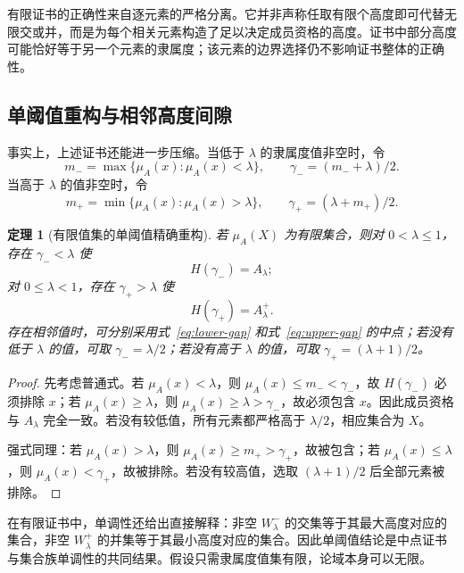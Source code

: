 \documentclass[UTF8,fontset=fandol,zihao=-4,a4paper]{ctexart}
\numberwithin{equation}{section}
\theoremstyle{reportplain}
\newtheorem{theorem}{定理}[section]
\newcommand{\muA}{\mu_A}
\newcommand{\cut}[1]{A_{#1}}
\newcommand{\scut}[1]{A_{#1}^{+}}
\newcommand{\set}[1]{\{#1\}}
\newcommand{\eqtag}[1]{\label{#1}}
\begin{document}
有限证书的正确性来自逐元素的严格分离。它并非声称任取有限个高度即可代替无限交或并，而是为每个相关元素构造了足以决定成员资格的高度。证书中部分高度可能恰好等于另一个元素的隶属度；该元素的边界选择仍不影响证书整体的正确性。

\subsection{单阈值重构与相邻高度间隙}
事实上，上述证书还能进一步压缩。当低于 $\lambda$ 的隶属度值非空时，令
\begin{equation}
m_- =\max\set{\muA(x):\muA(x)<\lambda},
\qquad\gamma_-=(m_-+\lambda)/2.
\eqtag{eq:lower-gap}
\end{equation}
当高于 $\lambda$ 的值非空时，令
\begin{equation}
m_+ =\min\set{\muA(x):\muA(x)>\lambda},
\qquad\gamma_+=(\lambda+m_+)/2.
\eqtag{eq:upper-gap}
\end{equation}

\begin{theorem}[有限值集的单阈值精确重构]
若 $\muA(X)$ 为有限集合，则对 $0<\lambda\le1$，存在 $\gamma_-<\lambda$ 使
\begin{equation}
H(\gamma_-)=\cut{\lambda};
\eqtag{eq:single-left}
\end{equation}
对 $0\le\lambda<1$，存在 $\gamma_+>\lambda$ 使
\begin{equation}
H(\gamma_+)=\scut{\lambda}.
\eqtag{eq:single-right}
\end{equation}
存在相邻值时，可分别采用式~\eqref{eq:lower-gap} 和式~\eqref{eq:upper-gap} 的中点；若没有低于 $\lambda$ 的值，可取 $\gamma_-=\lambda/2$；若没有高于 $\lambda$ 的值，可取 $\gamma_+=(\lambda+1)/2$。
\end{theorem}
\begin{proof}
先考虑普通式。若 $\muA(x)<\lambda$，则 $\muA(x)\le m_-<\gamma_-$，故 $H(\gamma_-)$ 必须排除 $x$；若 $\muA(x)\ge\lambda$，则 $\muA(x)\ge\lambda>\gamma_-$，故必须包含 $x$。因此成员资格与 $\cut{\lambda}$ 完全一致。若没有较低值，所有元素都严格高于 $\lambda/2$，相应集合为 $X$。

强式同理：若 $\muA(x)>\lambda$，则 $\muA(x)\ge m_+>\gamma_+$，故被包含；若 $\muA(x)\le\lambda$，则 $\muA(x)<\gamma_+$，故被排除。若没有较高值，选取 $(\lambda+1)/2$ 后全部元素被排除。\end{proof}

在有限证书中，单调性还给出直接解释：非空 $W^-_\lambda$ 的交集等于其最大高度对应的集合，非空 $W^+_\lambda$ 的并集等于其最小高度对应的集合。因此单阈值结论是中点证书与集合族单调性的共同结果。假设只需隶属度值集有限，论域本身可以无限。
\end{document}
